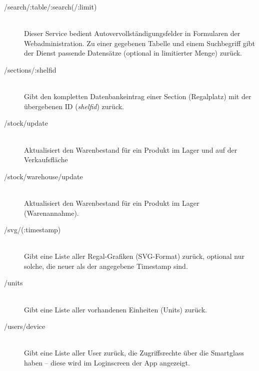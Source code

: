 \begin{description}
  \item[/search/:table/:search(/:limit)] \hfill \\
    Dieser Service bedient Autovervollständigungsfelder in Formularen der Webadministration. Zu einer gegebenen Tabelle und einem Suchbegriff gibt der Dienst passende Datensätze (optional in limitierter Menge) zurück.
  \item[/sections/:shelfid] \hfill \\
    Gibt den kompletten Datenbankeintrag einer Section (Regalplatz) mit der übergebenen ID (\emph{shelfid}) zurück.
  \item[/stock/update] \hfill \\
    Aktualisiert den Warenbestand für ein Produkt im Lager und auf der Verkaufsfläche
  \item[/stock/warehouse/update] \hfill \\
    Aktualisiert den Warenbestand für ein Produkt im Lager (\zB Warenannahme).
  \item[/svg/(:timestamp)] \hfill \\
    Gibt eine Liste aller Regal-Grafiken (SVG-Format) zurück, optional nur solche, die neuer als der angegebene Timestamp sind.
  \item[/units] \hfill \\
    Gibt eine Liste aller vorhandenen Einheiten (Units) zurück.
  \item[/users/device] \hfill \\
    Gibt eine Liste aller User zurück, die Zugriffsrechte über die Smartglass haben -- diese wird im Loginscreen der App angezeigt.
\end{description}
